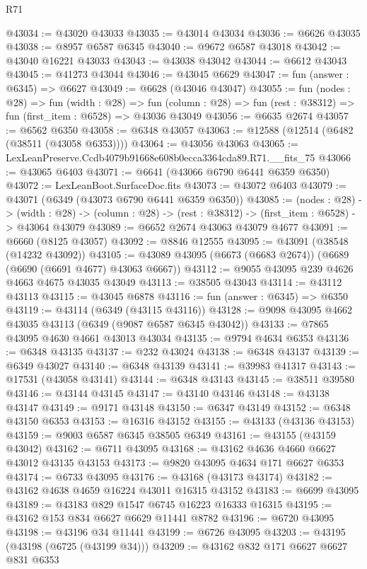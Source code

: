 \begin{lexlean}{R71}
\begin{coremodule}
@43034 := @43020 @43033
@43035 := @43014 @43034
@43036 := @6626 @43035
@43038 := @8957 @6587 @6345
@43040 := @9672 @6587 @43018
@43042 := @43040 @16221 @43033
@43043 := @43038 @43042
@43044 := @6612 @43043
@43045 := @41273 @43044
@43046 := @43045 @6629
@43047 := fun (answer : @6345) => @6627
@43049 := @6628 (@43046 @43047)
@43055 := fun (nodes : @28) =>
  fun (width : @28) =>
  fun (column : @28) => fun (rest : @38312) => fun (first_item : @6528) => @43036 @43049
@43056 := @6635 @2674
@43057 := @6562 @6350
@43058 := @6348 @43057
@43063 := @12588 (@12514 (@6482 (@38511 (@43058 @6353))))
@43064 := @43056 @43063
@43065 := LexLeanPreserve.Ccdb4079b91668e608b0ecca3364cda89.R71.__fits_75
@43066 := @43065 @6403
@43071 := @6641 (@43066 @6790 @6441 @6359 @6350)
@43072 := LexLeanBoot.SurfaceDoc.fits
@43073 := @43072 @6403
@43079 := @43071 (@6349 (@43073 @6790 @6441 @6359 @6350))
@43085 := (nodes : @28) ->
  (width : @28) -> (column : @28) -> (rest : @38312) -> (first_item : @6528) -> @43064 @43079
@43089 := @6652 @2674 @43063 @43079 @4677
@43091 := @6660 (@8125 @43057)
@43092 := @8846 @12555
@43095 := @43091 (@38548 (@14232 @43092))
@43105 := @43089 @43095 (@6673 (@6683 @2674)) (@6689 (@6690 (@6691 @4677) @43063 @6667))
@43112 := @9055 @43095 @239 @4626 @4663 @4675 @43035 @43049
@43113 := @38505 @43043
@43114 := @43112 @43113
@43115 := @43045 @6878
@43116 := fun (answer : @6345) => @6350
@43119 := @43114 (@6349 (@43115 @43116))
@43128 := @9098 @43095 @4662 @43035 @43113 (@6349 (@9087 @6587 @6345 @43042))
@43133 := @7865 @43095 @4630 @4661 @43013 @43034
@43135 := @9794 @4634 @6353
@43136 := @6348 @43135
@43137 := @232 @43024
@43138 := @6348 @43137
@43139 := @6349 @43027
@43140 := @6348 @43139
@43141 := @39983 @41317
@43143 := @17531 (@43058 @43141)
@43144 := @6348 @43143
@43145 := @38511 @39580
@43146 := @43144 @43145
@43147 := @43140 @43146
@43148 := @43138 @43147
@43149 := @9171 @43148
@43150 := @6347 @43149
@43152 := @6348 @43150 @6353
@43153 := @16316 @43152
@43155 := @43133 (@43136 @43153)
@43159 := @9003 @6587 @6345 @38505 @6349
@43161 := @43155 (@43159 @43042)
@43162 := @6711 @43095
@43168 := @43162 @4636 @4660 @6627 @43012 @43135 @43153
@43173 := @9820 @43095 @4634 @171 @6627 @6353
@43174 := @6733 @43095
@43176 := @43168 (@43173 @43174)
@43182 := @43162 @4638 @4659 @16224 @43011 @16315 @43152
@43183 := @6699 @43095
@43189 := @43183 @829 @1547 @6745 @16223 @16333 @16315
@43195 := @43162 @153 @834 @6627 @6629 @11441 @8782
@43196 := @6720 @43095
@43198 := @43196 @34 @11441
@43199 := @6726 @43095
@43203 := @43195 (@43198 (@6725 (@43199 @34)))
@43209 := @43162 @832 @171 @6627 @6627 @831 @6353

\end{coremodule}
\end{lexlean}
